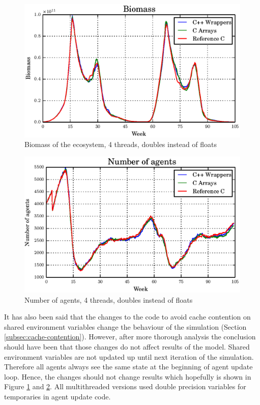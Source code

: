 \documentclass[12pt, a4paper]{report}
\begin{document}
\begin{appendices}
\begin{figure}[H]
  \begin{center}
    \includegraphics[width=\columnwidth]{graphs/bio-fixed-multi-double-comp.eps}
    \caption{Biomass of the ecosystem, 4 threads, doubles instead of floats}
    \label{fig:bio-fixed-multi-double-comp}
  \end{center}
\end{figure}

\begin{figure}[H]
  \begin{center}
    \includegraphics[width=\columnwidth]{graphs/ag-fixed-multi-double-comp.eps}
    \caption{Number of agents, 4 threads, doubles instead of floats}
    \label{fig:ag-fixed-multi-double-comp}
  \end{center}
\end{figure}

It has also been said that the changes to the code to avoid cache contention on shared
environment variables change the behaviour of the simulation (Section \ref{subsec:cache-contention}).
However, after more thorough analysis the conclusion should have been that those changes
do not affect results of the model. Shared environment variables are not updated up until
next iteration of the simulation. Therefore all agents always see the same state at the
beginning of agent update loop. Hence, the changes should not change results which
hopefully is shown in Figure \ref{fig:bio-fixed-multi-double-comp} and \ref{fig:ag-fixed-multi-double-comp}.
All multithreaded versions used double precision variables for temporaries in agent update
code.

\end{appendices}
\end{document}
